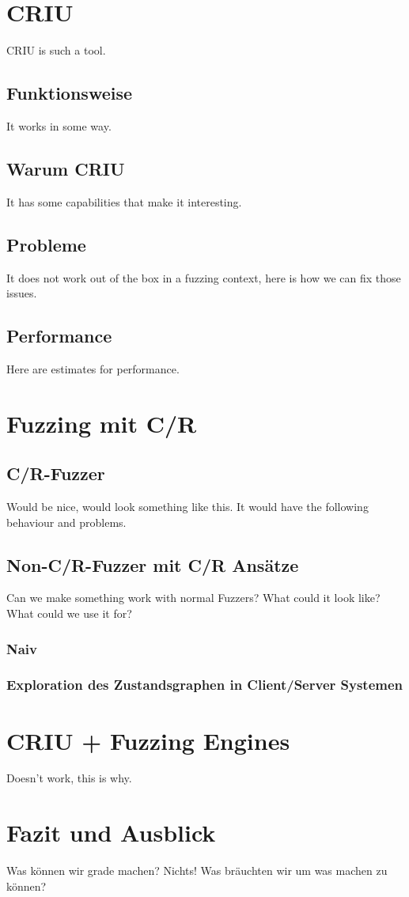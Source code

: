 \documentclass[12pt]{scrartcl}
\begin{document}
\section{CRIU}
CRIU is such a tool. 
\subsection{Funktionsweise}
It works in some way. 
\subsection{Warum CRIU}
It has some capabilities that make it interesting. 
\subsection{Probleme}
It does not work out of the box in a fuzzing context, here is how we can fix those issues. 
\subsection{Performance}
Here are estimates for performance.

\section{Fuzzing mit C/R}
\subsection{C/R-Fuzzer}
Would be nice, would look something like this. It would have the following behaviour and problems.
\subsection{Non-C/R-Fuzzer mit C/R Ansätze}
Can we make something work with normal Fuzzers? What could it look like? What could we use it for?
\subsubsection{Naiv}
\subsubsection{Exploration des Zustandsgraphen in Client/Server Systemen}

\section{CRIU + Fuzzing Engines}
Doesn't work, this is why.

\section{Fazit und Ausblick}
Was können wir grade machen? Nichts! Was bräuchten wir um was machen zu können?
\end{document}
